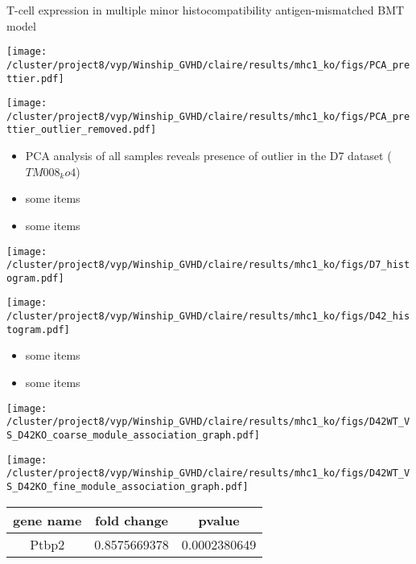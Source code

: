 \documentclass[final,hyperref={pdfpagelabels=false}]{beamer}
\begin{document}
\begin{frame}{}
\begin{columns}[t]
\begin{column}{.24\linewidth}
\begin{block}{T-cell expression in multiple minor histocompatibility antigen-mismatched BMT model}
	  \begin{minipage}{0.45\textwidth}
	    \texttt{[image: /cluster/project8/vyp/Winship\_GVHD/claire/results/mhc1\_ko/figs/PCA\_prettier.pdf]}
	  \end{minipage}	  
	  \begin{minipage}{0.45\textwidth}
	    \texttt{[image: /cluster/project8/vyp/Winship\_GVHD/claire/results/mhc1\_ko/figs/PCA\_prettier\_outlier\_removed.pdf]}
	  \end{minipage}	  
	  {\small
          \begin{itemize}
          \item PCA analysis of all samples reveals presence of outlier in the D7 dataset ($TM008_ko4$)
          \item some items
          \item some items
          \end{itemize} }
	  \begin{minipage}{0.45\textwidth}
            \texttt{[image: /cluster/project8/vyp/Winship\_GVHD/claire/results/mhc1\_ko/figs/D7\_histogram.pdf]}
          \end{minipage}
	  \begin{minipage}{0.45\textwidth}
            \texttt{[image: /cluster/project8/vyp/Winship\_GVHD/claire/results/mhc1\_ko/figs/D42\_histogram.pdf]}
          \end{minipage}
{\small
	  \begin{itemize}
	    \item some items
	    \item some items
	    \end{itemize} }
          \begin{minipage}{0.45\textwidth}
            \texttt{[image: /cluster/project8/vyp/Winship\_GVHD/claire/results/mhc1\_ko/figs/D42WT\_VS\_D42KO\_coarse\_module\_association\_graph.pdf]}
          \end{minipage}
          \begin{minipage}{0.45\textwidth}
            \texttt{[image: /cluster/project8/vyp/Winship\_GVHD/claire/results/mhc1\_ko/figs/D42WT\_VS\_D42KO\_fine\_module\_association\_graph.pdf]}
          \end{minipage}
	  \begin{center}
	{\small    \begin{tabular}{ |c|c|c| } 
	      \hline
	      gene name & fold change & pvalue \\
	      \hline
	      Ptbp2 & 0.8575669378 & 0.0002380649 \\

\end{tabular}}
\end{center}
\end{block}
\end{column}
\end{columns}
\end{frame}
\end{document}
